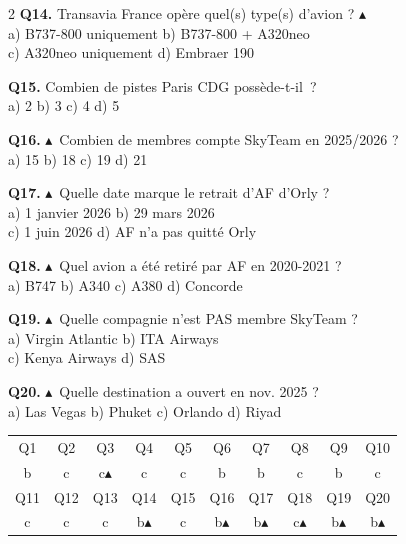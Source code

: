 \documentclass[9pt,a4paper,landscape]{article}
\newcommand{\CORR}{\textcolor{afred}{$\blacktriangle$}}
\begin{document}
\begin{multicols}{2}
\textbf{Q14.} Transavia France opère quel(s) type(s) d'avion ? \CORR\\
a) B737-800 uniquement \quad b) B737-800 + A320neo \\
c) A320neo uniquement \quad d) Embraer 190

\textbf{Q15.} Combien de pistes Paris CDG possède-t-il~?\\
a) 2 \quad b) 3 \quad c) 4 \quad d) 5

\textbf{Q16.} \CORR\ Combien de membres compte SkyTeam en 2025/2026 ?\\
a) 15 \quad b) 18 \quad c) 19 \quad d) 21

\textbf{Q17.} \CORR\ Quelle date marque le retrait d'AF d'Orly ?\\
a) 1 janvier 2026 \quad b) 29 mars 2026 \\
c) 1 juin 2026 \quad d) AF n'a pas quitté Orly

\textbf{Q18.} \CORR\ Quel avion a été retiré par AF en 2020-2021 ?\\
a) B747 \quad b) A340 \quad c) A380 \quad d) Concorde

\textbf{Q19.} \CORR\ Quelle compagnie n'est PAS membre SkyTeam ?\\
a) Virgin Atlantic \quad b) ITA Airways \\
c) Kenya Airways \quad d) SAS

\textbf{Q20.} \CORR\ Quelle destination a ouvert en nov. 2025 ?\\
a) Las Vegas \quad b) Phuket \quad c) Orlando \quad d) Riyad

\vspace{0.3cm}
\begin{tcolorbox}[colback=afrlight,colframe=afrgreen,title={\textbf{CORRIGÉS}},fonttitle=\bfseries\color{white}]
\begin{tabular}{cccccccccc}
Q1 & Q2 & Q3 & Q4 & Q5 & Q6 & Q7 & Q8 & Q9 & Q10 \\
b & c & c\CORR & c & c & b & b & c & b & c \\
\midrule
Q11 & Q12 & Q13 & Q14 & Q15 & Q16 & Q17 & Q18 & Q19 & Q20 \\
c & c & c & b\CORR & c & b\CORR & b\CORR & c\CORR & b\CORR & b\CORR \\
\end{tabular}
\end{tcolorbox}

\end{multicols}
\end{document}
